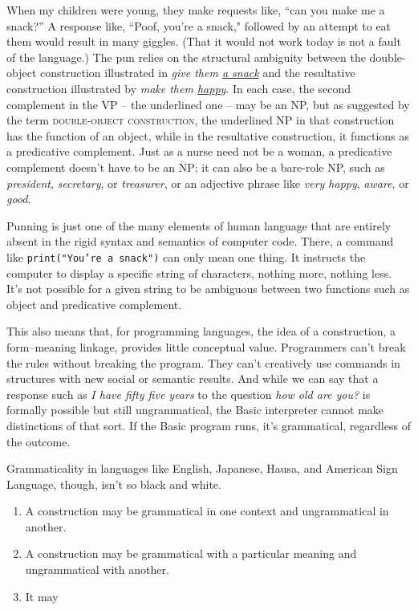 When my children were young, they make requests like, ``can you make me a snack?'' A response like, ``Poof, you're a snack," followed by an attempt to eat them would result in many giggles. (That it would not work today is not a fault of the language.) The pun relies on the structural ambiguity between the double-object construction illustrated in \textit{give them \uline{a snack}} and the resultative construction illustrated by \textit{make them \uline{happy}}. In each case, the second complement in the VP -- the underlined one -- may be an NP, but as suggested by the term \textsc{double-object construction}, the underlined NP in that construction has the function of an object, while in the resultative construction, it functions as a predicative complement. Just as a nurse need not be a woman, a predicative complement doesn't have to be an NP; it can also be a bare-role NP, such as \textit{president}, \textit{secretary}, or \textit{treasurer}, or an adjective phrase like \textit{very happy}, \textit{aware}, or \textit{good}.

Punning is just one of the many elements of human language that are entirely absent in the rigid syntax and semantics of computer code. There, a command like \texttt{print("You're a snack")} can only mean one thing. It instructs the computer to display a specific string of characters, nothing more, nothing less. It's not possible for a given string to be ambiguous between two functions such as object and predicative complement.

This also means that, for programming languages, the idea of a construction, a form--meaning linkage, provides little conceptual value. Programmers can't break the rules without breaking the program. They can't creatively use commands in structures with new social or semantic results. And while we can say that a response such as \textit{I have fifty five years} to the question \textit{how old are you?} is formally possible but still ungrammatical, the Basic interpreter cannot make distinctions of that sort. If the Basic program runs, it's grammatical, regardless of the outcome.

Grammaticality in languages like English, Japanese, Hausa, and American Sign Language, though, isn't so black and white.

\begin{enumerate}
    \item A construction may be grammatical in one context and ungrammatical in another.
    \item A construction may be grammatical with a particular meaning and ungrammatical with another.
    \item It may 
\end{enumerate}

